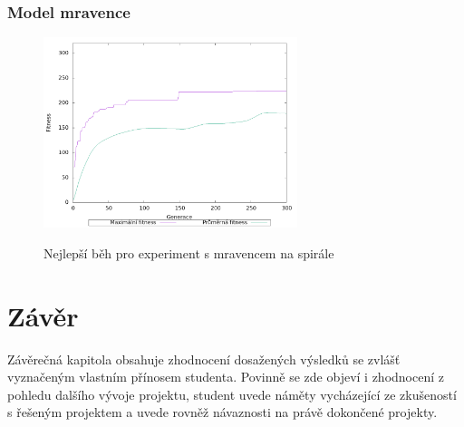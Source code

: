 \subsection{Model mravence}
\begin{figure}[h]
    \centering
    {\includegraphics[width=20em]{obrazky/mravenec_spirala_fitness_prubeh.png}}
    \caption{
    Nejlepší běh pro experiment s mravencem na spirále
    }
    \label{fig:mravenec_spirala_fitness_prubeh}
\end{figure}
















\chapter{Závěr}

Závěrečná kapitola obsahuje zhodnocení dosažených výsledků se zvlášť vyznačeným vlastním přínosem studenta. Povinně se zde objeví i zhodnocení z pohledu dalšího vývoje projektu, student uvede náměty vycházející ze zkušeností s řešeným projektem a uvede rovněž návaznosti na právě dokončené projekty.

